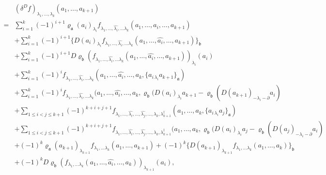 \documentclass[a4paper,11pt]{article}
\def\Vs{\mathfrak{a}}
\def\Ws{\mathfrak{b}}
\def\rep{\varrho}
\def\la{\lambda}
\numberwithin{equation}{section}
\begin{document}
\begin{equation*}
\begin{split}
  &(\delta^D f)_{\la_1,\ldots,\la_k}
  (a_1,\ldots,a_{k+1}) \\
  =& \sum_{i=1}^{k}(-1)^{i+1}
     \rep_\Vs(a_i)_{\la_i}
     f_{\la_1,\ldots,\widehat{\la_i},\ldots \la_k}(a_1,\ldots,\widehat{a_i},\ldots,a_{k+1})
     \\
  &+\sum_{i=1}^{k}(-1)^{i+1}
     \{D(a_i)_{\la_i}
     f_{\la_1,\ldots,\widehat{\la_i},\ldots \la_k}(a_1,\ldots,\widehat{a_i},\ldots,a_{k+1})\}_\Ws
     \\
  &+\sum_{i=1}^{k}(-1)^{i+1}
D\rep_\Ws(f_{\la_1,\ldots,\widehat{\la_i},\ldots \la_k}(a_1,\ldots,\widehat{a_i},\ldots,a_{k+1}))_{\la_i}(a_i)     
     \\
  &
    + \sum_{i=1}^{k}(-1)^i
    f_{\la_1,\ldots,\widehat{\la_i},\ldots \la_k}
      (a_1,\ldots,\widehat{a_i},\ldots,a_k,
       \{a_{i\,\la_i} a_{k+1}\}_\Vs)
      \\&
    + \sum_{i=1}^{k}(-1)^i
    f_{\la_1,\ldots,\widehat{\la_i},\ldots \la_k}
      (a_1,\ldots,\widehat{a_i},\ldots,a_k,
       \rep_\Ws(D(a_{i})_{\la_i} a_{k+1}-\rep_\Ws(D(a_{k+1})_{-\la_i-\partial} a_{i})
      \\
  &
    + \!\!\sum_{1\leq i<j\leq k+1}\!\!(-1)^{k+i+j+1}
      f_{\la_1,\ldots,\widehat{\la_i},\ldots ,\widehat{\la_j},\ldots, \la_k,\la_{k+1}^\ddag}
      (a_1,\ldots,a_k,\{a_{i\,\la_i}a_j\}_\Vs)
      \\ &
    + \!\!\sum_{1\leq i<j\leq k+1}\!\!(-1)^{k+i+j+1}
      f_{\la_1,\ldots,\widehat{\la_i},\ldots ,\widehat{\la_j},\ldots, \la_k,\la_{k+1}^\ddag}
      (a_1,\ldots,a_k,\rep_\Ws(D(a_{i})_{\la_i} a_{j}-\rep_\Ws(D(a_{j})_{-\la_i-\partial} a_{i})
      \\
      &+(-1)^{k}
     \rep_\Vs(a_{k+1})_{\la_{k+1}}
     f_{\la_1,\ldots \la_k}(a_1,\ldots,a_{k+1})
     +(-1)^{k}
     \{D(a_{k+1})_{\la_{k+1}}
     f_{\la_1,\ldots \la_k}(a_1,\ldots,a_{k})\}_\Ws
     \\
  &+(-1)^{k}
D\rep_\Ws(f_{\la_1,\ldots \la_k}(a_1,\ldots,\widehat{a_i},\ldots,a_{k}))_{\la_{k+1}}(a_i),
\end{split}
\end{equation*}
\end{document}
